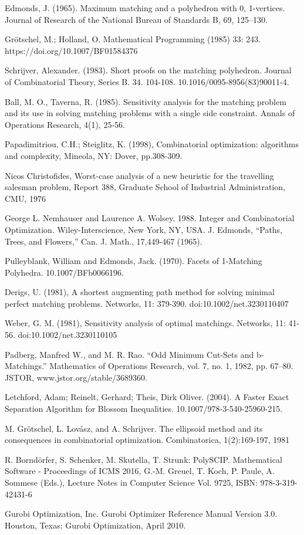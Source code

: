 \documentclass[twoside,a4paper,openright,12pt,tikz]{book}
\begin{document}
\begin{thebibliography}{9}
Edmonds, J. (1965). Maximum matching and a polyhedron with 0, 1-vertices. Journal of Research of the National Bureau of Standards B, 69, 125--130. 

  
Grötschel, M.; Holland, O. Mathematical Programming (1985) 33: 243. https://doi.org/10.1007/BF01584376

Schrijver, Alexander. (1983). Short proofs on the matching polyhedron. Journal of Combinatorial Theory, Series B. 34. 104-108. 10.1016/0095-8956(83)90011-4. 
 
Ball, M. O.,  Taverna, R. (1985). Sensitivity analysis for the matching problem and its use in solving matching problems with a single side constraint. Annals of Operations Research, 4(1), 25-56.

Papadimitriou, C.H.; Steiglitz, K. (1998), Combinatorial optimization: algorithms and complexity, Mineola, NY: Dover, pp.308-309.

Nicos Christofides, Worst-case analysis of a new heuristic for the travelling salesman problem, Report 388, Graduate School of Industrial Administration, CMU, 1976

George L. Nemhauser and Laurence A. Wolsey. 1988. Integer and Combinatorial Optimization. Wiley-Interscience, New York, NY, USA.
J. Edmonds, “Paths, Trees, and Flowers,” Can. J. Math., 17,449-467 (1965).

Pulleyblank, William and Edmonds, Jack. (1970). Facets of 1-Matching Polyhedra. 10.1007/BFb0066196. 

Derigs, U. (1981), A shortest augmenting path method for solving minimal perfect matching problems. Networks, 11: 379-390. doi:10.1002/net.3230110407

Weber, G. M. (1981), Sensitivity analysis of optimal matchings. Networks, 11: 41-56. doi:10.1002/net.3230110105

Padberg, Manfred W., and M. R. Rao. “Odd Minimum Cut-Sets and b-Matchings.” Mathematics of Operations Research, vol. 7, no. 1, 1982, pp. 67–80. JSTOR, www.jstor.org/stable/3689360.

Letchford, Adam;  Reinelt, Gerhard; Theis, Dirk Oliver. (2004). A Faster Exact Separation Algorithm for Blossom Inequalities. 10.1007/978-3-540-25960-215. 

M. Grötschel, L. Lovász, and A. Schrijver. The ellipsoid method and its
consequences in combinatorial optimization. Combinatorica, 1(2):169-197, 1981

R. Borndörfer, S. Schenker, M. Skutella, T. Strunk: PolySCIP.
Mathematical Software - Proceedings of ICMS 2016, G.-M. Greuel, T. Koch, P. Paule, A. Sommese (Eds.),
Lecture Notes in Computer Science Vol. 9725, ISBN: 978-3-319-42431-6

Gurobi Optimization, Inc. Gurobi Optimizer Reference Manual Version 3.0. Houston, Texas: Gurobi Optimization, April 2010.
\end{thebibliography}
\end{document}
